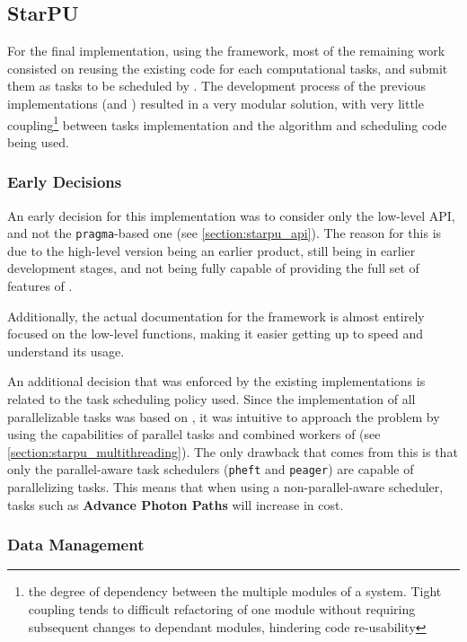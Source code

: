 \documentclass[main.tex]{subfiles}
\begin{document}
\subsection{StarPU} \label{section:impl_starpu}

For the final implementation, using the \starpu framework, most of the remaining work consisted on reusing the existing code for each computational tasks, and submit them as tasks to be scheduled by \starpu. The development process of the previous implementations (\cpu and \cuda) resulted in a very modular solution, with very little coupling\footnote{the degree of dependency between the multiple modules of a system. Tight coupling tends to difficult refactoring of one module without requiring subsequent changes to dependant modules, hindering code re-usability} between tasks implementation and the algorithm and scheduling code being used.

\subsubsection{Early Decisions}

An early decision for this implementation was to consider only the low-level API, and not the \texttt{pragma}-based one (see \cref{section:starpu_api}). The reason for this is due to the high-level version being an earlier product, still being in earlier development stages, and not being fully capable of providing the full set of features of \starpu.

Additionally, the actual documentation for the framework is almost entirely focused on the low-level functions, making it easier getting up to speed and understand its usage.

An additional decision that was enforced by the existing implementations is related to the task scheduling policy used. Since the \cpu implementation of all parallelizable tasks was based on \openmp, it was intuitive to approach the problem by using the capabilities of parallel tasks and combined workers of \starpu (see \cref{section:starpu_multithreading}). The only drawback that comes from this is that only the parallel-aware task schedulers (\texttt{pheft} and \texttt{peager}) are capable of parallelizing \cpu tasks. This means that when using a non-parallel-aware scheduler, \cpu tasks such as \textbf{Advance Photon Paths} will increase in cost.

\subsubsection{Data Management}
\end{document}
